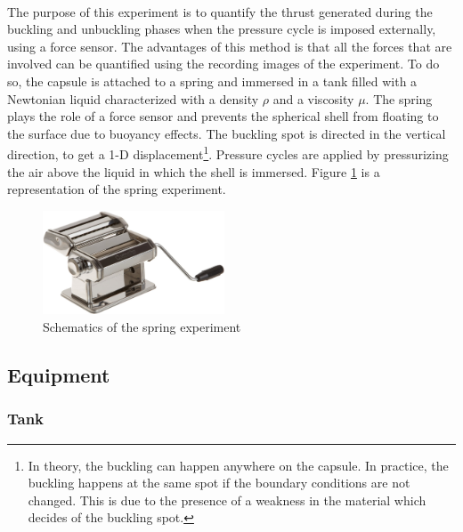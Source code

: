 \paragraph{}
The purpose of this experiment is to quantify the thrust generated during the buckling and unbuckling phases when the pressure cycle is imposed externally, using a force sensor. The advantages of this method is that all the forces that are involved can be quantified using the recording images of the experiment. To do so, the capsule is attached to a spring and immersed in a tank filled with a Newtonian liquid characterized with a density $\rho$ and a viscosity $\mu$. The spring plays the role of a force sensor and prevents the spherical shell from floating to the surface due to buoyancy effects.  The buckling spot is directed in the vertical direction, to get a 1-D displacement\footnote{In theory, the buckling can happen anywhere on the capsule. In practice, the buckling happens at the same spot if the boundary conditions are not changed. This is due to the presence of a weakness in the material which decides of the buckling spot.}. Pressure cycles are applied by pressurizing the air above the liquid in which the shell is immersed. Figure \ref{fig:spring_experiment_schematic} is a representation of the spring experiment.
\begin{figure}[h] %
	\centering%
  \includegraphics[width=0.48\textwidth]{figures/Chapter_1/rolling_machine.png}
	\caption{Schematics of the spring experiment}
	\label{fig:spring_experiment_schematic}
\end{figure}

\subsection{Equipment}
\subsubsection{Tank}
